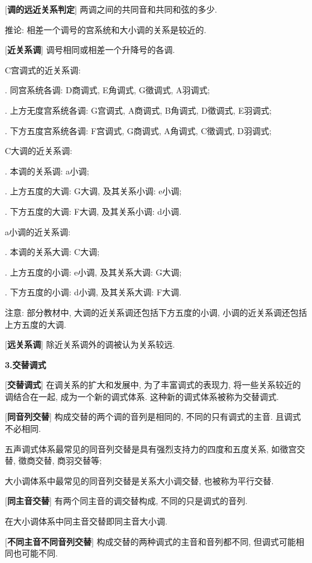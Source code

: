 [\textbf{调的远近关系判定}] 两调之间的共同音和共同和弦的多少.\par
\qquad 推论: 相差一个调号的宫系统和大小调的关系是较近的.\par

[\textbf{近关系调}] 调号相同或相差一个升降号的各调.\par
\qquad C宫调式的近关系调: \par
\qquad {}. 同宫系统各调: D商调式, E角调式, G徵调式, A羽调式;\par
\qquad {}. 上方无度宫系统各调: G宫调式, A商调式, B角调式, D徵调式, E羽调式;\par
\qquad {}. 下方五度宫系统各调: F宫调式, G商调式, A角调式, C徵调式, D羽调式;\par
\clearpage
\qquad C大调的近关系调:\par
\qquad {}. 本调的关系调: a小调;\par
\qquad {}. 上方五度的大调: G大调, 及其关系小调: e小调;\par
\qquad {}. 下方五度的大调: F大调, 及其关系小调: d小调.\par
\qquad a小调的近关系调:\par
\qquad {}. 本调的关系大调: C大调;\par
\qquad {}. 上方五度的小调: e小调, 及其关系大调: G大调;\par
\qquad {}. 下方五度的小调: d小调, 及其关系大调: F大调.\par
\qquad 注意: 部分教材中, 大调的近关系调还包括下方五度的小调, 小调的近关系调还包括上方五度的大调.\par

[\textbf{远关系调}] 除近关系调外的调被认为关系较远.\par

\begin{center}
 \textbf{3.交替调式}\\
\end{center}

[\textbf{交替调式}] 在调关系的扩大和发展中, 为了丰富调式的表现力, 将一些关系较近的调结合在一起, 成为一个新的调式体系. 这种新的调式体系被称为交替调式.\par

[\textbf{同音列交替}] 构成交替的两个调的音列是相同的, 不同的只有调式的主音. 且调式不必相同.\par
\qquad 五声调式体系最常见的同音列交替是具有强烈支持力的四度和五度关系, 如徵宫交替, 徵商交替, 商羽交替等;\par
\qquad 大小调体系中最常见的同音列交替是关系大小调交替, 也被称为平行交替.\par

[\textbf{同主音交替}] 有两个同主音的调交替构成, 不同的只是调式的音列.\par
\qquad 在大小调体系中同主音交替即同主音大小调.\par

[\textbf{不同主音不同音列交替}] 构成交替的两种调式的主音和音列都不同, 但调式可能相同也可能不同.\par


